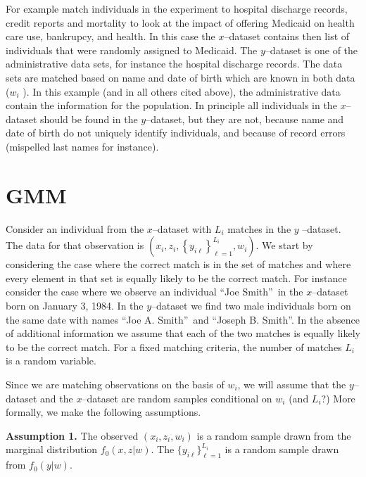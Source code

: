 \documentclass[12pt]{article}
\renewcommand{\cite}{\citeasnoun}
\begin{document}
For example \cite{Finkelstein2012} match individuals in the experiment to
hospital discharge records, credit reports and mortality to look at the
impact of offering Medicaid on health care use, bankrupcy, and health. In
this case the $x$--dataset contains then list of individuals that were
randomly assigned to Medicaid. The $y$--dataset is one of the administrative
data sets, for instance the hospital discharge records. The data sets are
matched based on name and date of birth which are known in both data ($w_{i}$%
). In this example (and in all others cited above), the administrative data
contain the information for the population. In principle all individuals in
the $x$--dataset should be found in the $y$--dataset, but they are not,
because name and date of birth do not uniquely identify individuals, and
because of record errors (mispelled last names for instance).

\section{GMM}

Consider an individual from the $x$--dataset with $L_{i}$ matches in the $y$%
--dataset. The data for that observation is $\left( x_{i},z_{i},\left\{
y_{i\ell }\right\} _{\ell =1}^{L_{i}},w_{i}\right) $. We start by
considering the case where the correct match is in the set of matches and
where every element in that set is equally likely to be the correct match.
For instance consider the case where we observe an individual
\textquotedblleft Joe Smith\textquotedblright\ in the $x$--dataset born on
January 3, 1984. In the $y$--dataset we find two male individuals born on the
same date with names \textquotedblleft Joe A. Smith\textquotedblright\ and
\textquotedblleft Joseph B. Smith\textquotedblright . In the absence of
additional information we assume that each of the two matches is equally
likely to be the correct match. For a fixed matching criteria, the number of
matches $L_{i}$ is a random variable.

Since we are matching observations on the basis of $w_{i}$, we will assume
that the $y$--dataset and the $x$--dataset are random samples conditional on
$w_{i}$ (and $L_i$?) More formally, we make the following assumptions. 

\textbf{Assumption 1.} The observed $(x_i, z_i, w_i)$ is a random sample drawn%
from the marginal distribution $f_0(x,z | w)$.   The $\{y_{i\ell}\}_{\ell=1}^{L_i}$ is a random sample drawn from $f_0 (y | w)$.
\end{document}
